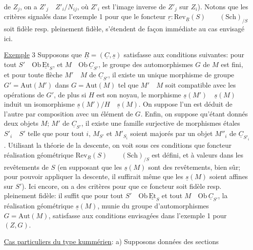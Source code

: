 de $Z_j$, on a $Z'_j\quad Z'_i/N_{ij}$, où $Z'_i$ est l'image inverse de $Z'_j$ sur $Z_i$). Notons que les critères signalés dans l'exemple 1 pour que le foncteur $\underline{r}:\mathrm{Rev}_{\underline{R}}(S)\qquad(\mathrm{Sch})_{/S}$ soit fidèle resp. pleinement fidèle, s'étendent de façon immédiate au cas envisagé ici.

\uline{Exemple} 3 Supposons que $\underline{R}=(\underline{C},\underline{s})$ satisfasse aux conditions suivantes: pour tout $S'\quad\mathrm{Ob}\,\underline{\mathrm{Et}}_S$, et $M\quad\mathrm{Ob}\,\underline{C}_{S'}$, le groupe des automorphismes $G$ de $M$ est fini, et pour toute flèche $M'\quad M$ de $\underline{C}_{S'}$, il existe un unique morphisme de groupe $G'=\mathrm{Aut}(M')$ dans $G=\mathrm{Aut}(M)$ tel que $M'\quad M$ soit compatible avec les opérations de $G'$, de plus si $H$ est son noyau, le morphisme $\underline{s}(M')\quad\underline{s}(M)$ induit un isomorphisme $\underline{s}(M')/H\quad\underline{s}(M)$.  On suppose  l'un est déduit de l'autre par composition avec un élément de $G$. Enfin, on suppose qu'étant donnés deux objets $M$; $M'$ de $\underline{C}_{S'}$, il existe une famille surjective de morphismes étales $S'_i\quad S'$ telle que pour tout $i$, $M_{S'}$ et $M'_{S_i}$ soient majorés par un objet $M''_i$ de $\underline{C}_{S'_i}$. Utilisant la théorie de la descente, on voit sous ces conditions que  foncteur réalisation géométrique  $\mathrm{Rev}_{\underline{R}}(S)\qquad(\mathrm{Sch})_{/S}$ est défini, et à valeurs dans les  revêtements de $S$ (en supposant que les $\underline{s}(M)$ sont des revêtements, bien sûr; pour pouvoir appliquer la descente, il suffirait même que les $\underline{s}(M)$ soient affines sur $S'$). Ici encore, on a des critères pour que ce foncteur soit fidèle resp. pleinement fidèle: il suffit que pour tout $S'\quad\mathrm{Ob}\,\underline{\mathrm{Et}}_S$ et tout $M\quad\mathrm{Ob}\,\underline{C}_{S'}$, la réalisation géométrique $\underline{s}(M)$, munie du groupe d'automorphismes $G=\mathrm{Aut}(M)$, satisfasse aux conditions  envisagées dans l'exemple 1 pour $(Z,G)$.

\uline{Cas particuliers du type kummérien}: a) Supposons données des sections
